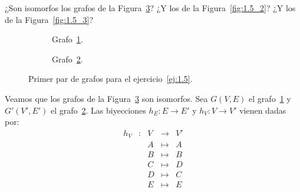 \begin{ejercicio}\label{ej:1.5}
    ¿Son isomorfos los grafos de la Figura~\ref{fig:1.5_1}? ¿Y los de la Figura~\ref{fig:1.5_2}? ¿Y los de la Figura~\ref{fig:1.5_3}?\\
    
    \begin{figure}
        \centering
        \begin{subfigure}[b]{0.4\textwidth}
            \centering
            \caption{Grafo~\ref{fig:1.5_1.a}.}
            \label{fig:1.5_1.a}
        \end{subfigure}
        \begin{subfigure}[b]{0.4\textwidth}
            \centering
            \caption{Grafo~\ref{fig:1.5_1.b}.}
            \label{fig:1.5_1.b}
        \end{subfigure}
        \caption{Primer par de grafos para el ejercicio~\ref{ej:1.5}.}
        \label{fig:1.5_1}
    \end{figure}

    Veamos que los grafos de la Figura~\ref{fig:1.5_1} son isomorfos. Sea $G(V,E)$ el grafo~\ref{fig:1.5_1.a} y $G'(V',E')$ el grafo~\ref{fig:1.5_1.b}.
    Las biyecciones $h_E:E\to E'$ y $h_V:V\to V'$ vienen dadas por:
    \begin{equation*}
        \begin{array}{rlccc}
            h_V & : & V & \to & V'\\
            &  & A & \mapsto & A\\
            &  & B & \mapsto & B\\
            &  & C & \mapsto & D\\
            &  & D & \mapsto & C\\
            &  & E & \mapsto & E
        \end{array}
    \end{equation*}



\end{ejercicio}
